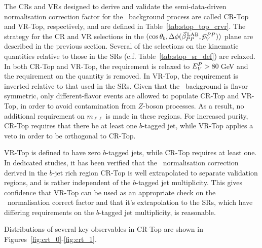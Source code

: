 The CRs and VRs designed to derive and validate the semi-data-driven
normalisation correction factor for the \ttbar~background process are called
CR-Top and VR-Top, respectively, and are defined in Table~\ref{tab:stop_top_crvr}.
The strategy for the CR and VR selections in the $(\cos\theta_b, \Delta \phi (\vec{\beta}_{PP}^{\,\text{LAB}}, \vec{p}_V^{\,PP}))$ plane are described
in the previous section.
Several of the selections on the kinematic quantities relative to those in the SRs (c.f. Table~\ref{tab:stop_sr_def})
are relaxed.
In both CR-Top and VR-Top, the \mdr requirement is relaxed to $E_V^P > 80$\,GeV and the requirement on the
\gaminv quantity is removed.
In VR-Top, the \rpt requirement is inverted relative to that used in the SRs.
Given that the \ttbar~background is flavor symmetric, only different-flavor events
are allowed to populate CR-Top and VR-Top, in order to avoid contamination from $Z$-boson processes.
As a result, no additional requirement on $m_{\ell\ell}$ is made in these regions.
For increased purity, CR-Top requires that there be at least one $b$-tagged jet,
while VR-Top applies a veto in order to be orthogonal to CR-Top.

VR-Top is defined to have zero $b$-tagged jets, while CR-Top requires at least one.
In dedicated studies, it has been verified that the \ttbar~normalisation correction derived
in the $b$-jet rich region CR-Top is well extrapolated to separate validation regions, and is rather
independent of the $b$-tagged jet multiplicity.
This gives confidence that VR-Top can be used as an appropriate check on the \ttbar~normalisation
correct factor and that it's extrapolation to the SRs, which have differing requirements on the
$b$-tagged jet multiplicity, is reasonable.

Distributions of several key observables in CR-Top are shown in Figures~\ref{fig:crt_0}-\ref{fig:crt_1}.

